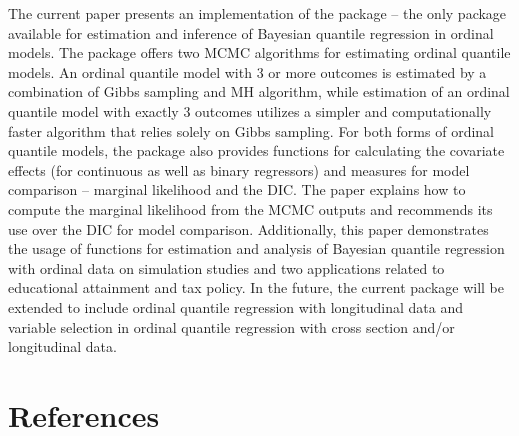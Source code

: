 The current paper presents an implementation of the  package -- the only package available for estimation and inference of Bayesian quantile regression in ordinal models. The package offers two MCMC algorithms for estimating ordinal quantile models. An ordinal quantile model with 3 or more outcomes is estimated by a combination of Gibbs sampling and MH algorithm, while estimation of an ordinal quantile model with exactly 3 outcomes utilizes a simpler and computationally faster algorithm that relies solely on Gibbs sampling. For both forms of ordinal quantile models, the  package also provides functions for calculating the covariate effects (for continuous as well as binary regressors) and measures for model comparison -- marginal likelihood and the DIC. The paper explains how to compute the marginal likelihood from the MCMC outputs and recommends its use over the DIC for model comparison. Additionally, this paper demonstrates the usage of functions for estimation and analysis of Bayesian quantile regression with ordinal data on simulation studies and two applications related to educational attainment and tax policy. In the future, the current package will be extended to include ordinal quantile regression with longitudinal data and variable selection in ordinal quantile regression with cross section and/or longitudinal data.

\hypertarget{references}{%
\section*{References}\label{references}}

